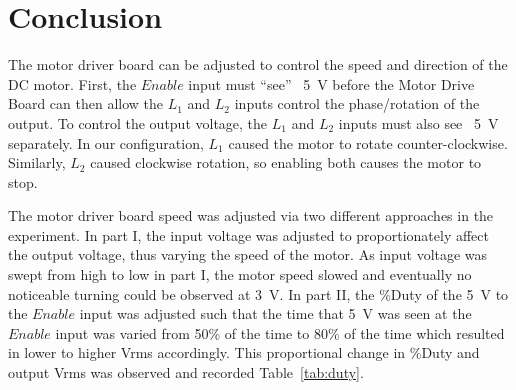 \section{Conclusion}
\label{sec:conclusion}

The motor driver board can be adjusted to control the speed and direction of the DC motor.  First, the $Enable$ input must ``see'' ~\SI{5}{V} before the Motor Drive Board can then allow the $L_1$ and $L_2$ inputs control the phase/rotation of the output.  To control the output voltage, the $L_1$ and $L_2$ inputs must also see ~\SI{5}{V} separately.  In our configuration, $L_1$ caused the motor to rotate counter-clockwise.  Similarly, $L_2$ caused clockwise rotation, so enabling both causes the motor to stop.

The motor driver board speed was adjusted via two different approaches in the experiment.  In part I, the input voltage was adjusted to proportionately affect the output voltage, thus varying the speed of the motor.  As input voltage was swept from high to low in part I, the motor speed slowed and eventually no noticeable turning could be observed at \SI{3}{V}.  In part II, the \%Duty of the \SI{5}{V} to the $Enable$ input was adjusted such that the time that \SI{5}{V} was seen at the $Enable$ input was varied from 50\% of the time to 80\% of the time which resulted in lower to higher Vrms accordingly.  This proportional change in \%Duty and output Vrms was observed and recorded Table~\ref{tab:duty}.




